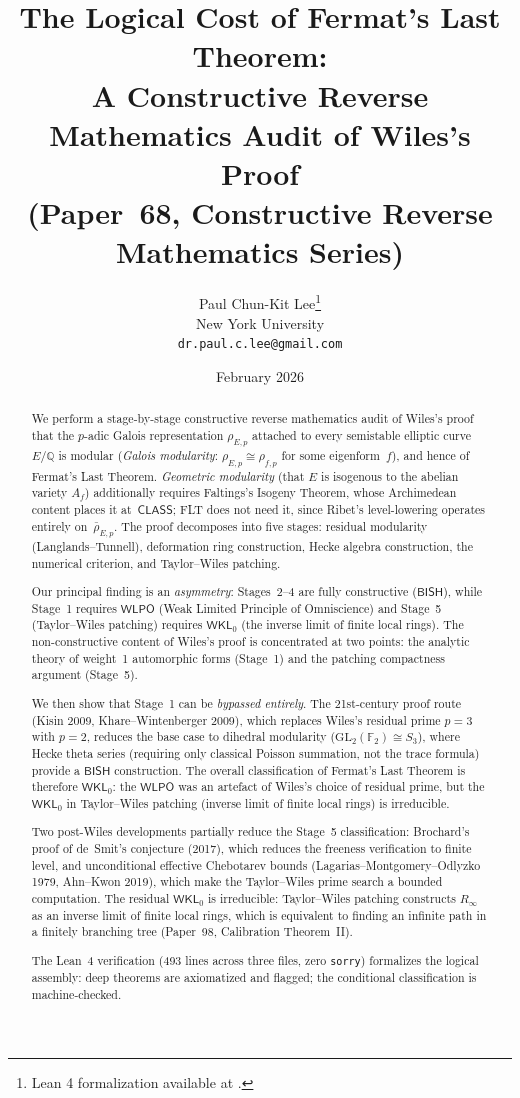 \documentclass[11pt]{article}
\title{The Logical Cost of Fermat's Last Theorem:\\
  A Constructive Reverse Mathematics Audit of Wiles's Proof\\[6pt]
  {\large (Paper~68, Constructive Reverse Mathematics Series)}}
\author{Paul Chun-Kit Lee\thanks{Lean 4 formalization available at \leanRepo.} \\
New York University \\
\texttt{dr.paul.c.lee@gmail.com}}
\date{February 2026}
\theoremstyle{plain}
\theoremstyle{definition}
\theoremstyle{remark}
\newcommand{\Q}{\mathbb{Q}}
\newcommand{\F}{\mathbb{F}}
\newcommand{\GL}{\mathrm{GL}}
\newcommand{\BISH}{\mathsf{BISH}}
\newcommand{\WLPO}{\mathsf{WLPO}}
\newcommand{\WKL}{\mathsf{WKL}_0}
\newcommand{\CLASS}{\mathsf{CLASS}}
\begin{document}
\maketitle

\begin{abstract}

We perform a stage-by-stage constructive reverse mathematics
audit of Wiles's proof that the $p$-adic Galois representation
$\rho_{E,p}$ attached to every semistable elliptic curve
$E/\Q$ is modular (\emph{Galois modularity}:
$\rho_{E,p} \cong \rho_{f,p}$ for some eigenform~$f$),
and hence of Fermat's Last Theorem.
\emph{Geometric modularity} (that $E$ is isogenous to the
abelian variety $A_f$) additionally requires Faltings's Isogeny
Theorem, whose Archimedean content places it at~$\CLASS$; FLT
does not need it, since Ribet's level-lowering operates entirely
on~$\bar{\rho}_{E,p}$.
The proof decomposes into five stages: residual modularity
(Langlands--Tunnell), deformation ring construction, Hecke algebra
construction, the numerical criterion, and Taylor--Wiles patching.

Our principal finding is an \emph{asymmetry}: Stages~2--4 are
fully constructive ($\BISH$), while Stage~1 requires $\WLPO$
(Weak Limited Principle of Omniscience) and Stage~5
(Taylor--Wiles patching) requires $\WKL$
(the inverse limit of finite local rings).
The non-constructive content of Wiles's proof is concentrated
at two points: the analytic theory of weight~1 automorphic forms
(Stage~1) and the patching compactness argument (Stage~5).

We then show that Stage~1 can be \emph{bypassed entirely}.
The 21st-century proof route (Kisin 2009, Khare--Wintenberger
2009), which replaces Wiles's residual prime $p = 3$ with
$p = 2$, reduces the base case to dihedral modularity
($\GL_2(\F_2) \cong S_3$), where Hecke theta series
(requiring only classical Poisson summation, not the trace formula)
provide a $\BISH$ construction.
The overall classification of Fermat's Last Theorem is therefore
$\WKL$: the $\WLPO$ was an artefact of Wiles's
choice of residual prime, but the $\WKL$ in Taylor--Wiles
patching (inverse limit of finite local rings) is irreducible.

Two post-Wiles developments partially reduce the Stage~5
classification: Brochard's proof of de~Smit's conjecture (2017),
which reduces the freeness verification to finite level, and
unconditional effective Chebotarev bounds
(Lagarias--Montgomery--Odlyzko 1979, Ahn--Kwon 2019), which make
the Taylor--Wiles prime search a bounded computation.
The residual $\WKL$ is irreducible: Taylor--Wiles patching
constructs $R_\infty$ as an inverse limit of finite local rings,
which is equivalent to finding an infinite path in a finitely
branching tree (Paper~98, Calibration Theorem~II).

The Lean~4 verification (493 lines across three files,
zero \texttt{sorry}) formalizes the logical
assembly: deep theorems are axiomatized and flagged; the
conditional classification is machine-checked.

\end{abstract}
\end{document}
